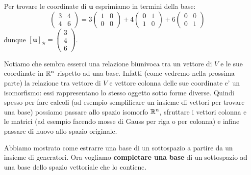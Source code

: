 \begin{solution}
    Per trovare le coordinate di $\bm{u}$ esprimiamo in termini della base:
    \begin{equation*}
        \begin{pmatrix}
            3 & 4 \\ 4 & 6
        \end{pmatrix} = 3\begin{pmatrix} 1&0\\0&0 \end{pmatrix} + 4\begin{pmatrix} 0&1\\1&0 \end{pmatrix} + 6\begin{pmatrix} 0&0\\0&1 \end{pmatrix}
    \end{equation*}
    dunque $[\bm{u}]_{\mathcal{B}} = \begin{pmatrix}
        3 \\ 4 \\ 6
    \end{pmatrix}$.
\end{solution}

Notiamo che sembra esserci una relazione biunivoca tra un vettore di $V$ e le sue coordinate in $\mathbb{R}^n$ rispetto ad una base. Infatti (come vedremo nella prossima parte) la relazione tra vettore di $V$ e vettore colonna delle sue coordinate e' un isomorfismo: essi rappresentano lo stesso oggetto sotto forme diverse. Quindi spesso per fare calcoli (ad esempio semplificare un insieme di vettori per trovare una base) possiamo passare allo spazio isomorfo $\mathbb{R}^n$, sfruttare i vettori colonna e le matrici (ad esempio facendo mosse di Gauss per riga o per colonna) e infine passare di nuovo allo spazio originale.

Abbiamo mostrato come estrarre una base di un sottospazio a partire da un insieme di generatori. Ora vogliamo \textbf{completare una base} di un sottospazio ad una base dello spazio vettoriale che lo contiene.

